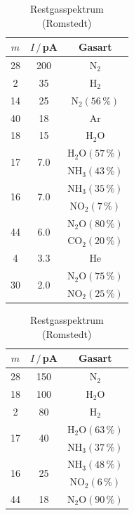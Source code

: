 \documentclass[german, parskip=full]{scrartcl}
\newcommand{\tecxt}{}
\begin{document}
\begin{table}[!htp]
\centering
\begin{minipage}{0.5\textwidth}
\centering
\begin{tabular}{c|c|c}
$m$&$I\,/\,$pA&Gasart\\ \hline
28&200&$\tecxt\text{N}_2$\\ \hline
2&35&$\tecxt\text{H}_2$\\ \hline
14&25&$\tecxt\text{N}_2(56\,\%)$\\ \hline
40&18&$\tecxt\text{Ar}$\\ \hline
18&15&$\tecxt\text{H}_2\tecxt\text{O}$\\ \hline
\multirow{2}{*}{17}&\multirow{2}{*}{7.0}&$\tecxt\text{H}_2\tecxt\text{O}(57\,\%)$\\ 
&&$\tecxt\text{NH}_3(43\,\%)$\\ \hline
\multirow{2}{*}{16}&\multirow{2}{*}{7.0}&$\tecxt\text{NH}_3(35\,\%)$\\ 
&&$\tecxt\text{NO}_2(7\,\%)$\\ \hline
\multirow{2}{*}{44}&\multirow{2}{*}{6.0}&$\tecxt\text{N}_2\tecxt\text{O}(80\,\%)$\\ 
&&$\tecxt\text{CO}_2(20\,\%)$\\ \hline
4&3.3&He\\ \hline
\multirow{2}{*}{30}&\multirow{2}{*}{2.0}&$\tecxt\text{N}_2\tecxt\text{O}(75\,\%)$\\
&&$\tecxt\text{NO}_2(25\,\%)$\\
\end{tabular}
\caption{Restgasspektrum (Romstedt)}
\label{table:RestgasspektrumRomstedt}
\end{minipage}%
\begin{minipage}{0.5\textwidth}
\centering
\begin{tabular}{c|c|c}
$m$&$I\,/\,$pA&Gasart\\ \hline
28&150&$\tecxt\text{N}_2$\\ \hline
18&100&$\tecxt\text{H}_2\tecxt\text{O}$\\ \hline
2&80&$\tecxt\text{H}_2$\\ \hline
\multirow{2}{*}{17}&\multirow{2}{*}{40}&$\tecxt\text{H}_2\tecxt\text{O}(63\,\%)$\\ 
&&$\tecxt\text{NH}_3(37\,\%)$\\ \hline
\multirow{2}{*}{16}&\multirow{2}{*}{25}&$\tecxt\text{NH}_3(48\,\%)$\\ 
&&$\tecxt\text{NO}_2(6\,\%)$\\ \hline
\multirow{2}{*}{44}&\multirow{2}{*}{18}&$\tecxt\text{N}_2\tecxt\text{O}(90\,\%)$\\ 

\end{tabular}
\end{minipage}
\end{table}
\end{document}
